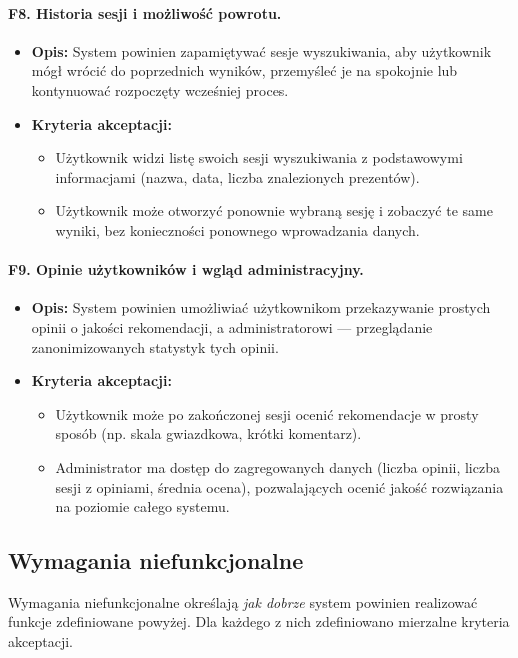 \documentclass[12pt,a4paper]{article}
\begin{document}
\paragraph{F8. Historia sesji i możliwość powrotu.}
\begin{itemize}
    \item \textbf{Opis:} System powinien zapamiętywać sesje wyszukiwania, aby użytkownik mógł wrócić do poprzednich wyników, przemyśleć je na spokojnie lub kontynuować rozpoczęty wcześniej proces.
    \item \textbf{Kryteria akceptacji:}
    \begin{itemize}
        \item Użytkownik widzi listę swoich sesji wyszukiwania z podstawowymi informacjami (nazwa, data, liczba znalezionych prezentów).
        \item Użytkownik może otworzyć ponownie wybraną sesję i zobaczyć te same wyniki, bez konieczności ponownego wprowadzania danych.
    \end{itemize}
\end{itemize}

\paragraph{F9. Opinie użytkowników i wgląd administracyjny.}
\begin{itemize}
    \item \textbf{Opis:} System powinien umożliwiać użytkownikom przekazywanie prostych opinii o jakości rekomendacji, a administratorowi — przeglądanie zanonimizowanych statystyk tych opinii.
    \item \textbf{Kryteria akceptacji:}
    \begin{itemize}
        \item Użytkownik może po zakończonej sesji ocenić rekomendacje w prosty sposób (np. skala gwiazdkowa, krótki komentarz).
        \item Administrator ma dostęp do zagregowanych danych (liczba opinii, liczba sesji z opiniami, średnia ocena), pozwalających ocenić jakość rozwiązania na poziomie całego systemu.
    \end{itemize}
\end{itemize}

\subsection{Wymagania niefunkcjonalne}
Wymagania niefunkcjonalne określają \emph{jak dobrze} system powinien realizować funkcje zdefiniowane powyżej. Dla każdego z nich zdefiniowano mierzalne kryteria akceptacji.
\end{document}
